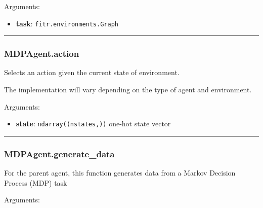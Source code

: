Arguments:

\begin{itemize}
\tightlist
\item
  \textbf{task}: \texttt{fitr.environments.Graph}
\end{itemize}

\begin{center}\rule{0.5\linewidth}{\linethickness}\end{center}

\subsubsection{MDPAgent.action}\label{mdpagent.action}

\begin{Shaded}
\begin{Highlighting}[]
\end{Highlighting}
\end{Shaded}

Selects an action given the current state of environment.

The implementation will vary depending on the type of agent and
environment.

Arguments:

\begin{itemize}
\tightlist
\item
  \textbf{state}: \texttt{ndarray((nstates,))} one-hot state vector
\end{itemize}

\begin{center}\rule{0.5\linewidth}{\linethickness}\end{center}

\subsubsection{MDPAgent.generate\_data}\label{mdpagent.generate_data}

\begin{Shaded}
\begin{Highlighting}[]
\end{Highlighting}
\end{Shaded}

For the parent agent, this function generates data from a Markov
Decision Process (MDP) task

Arguments:

